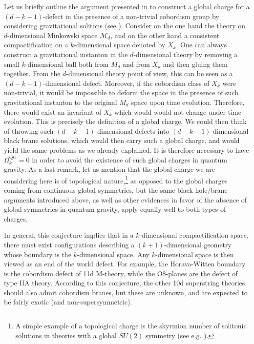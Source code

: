 \documentclass[11pt,a4paper]{article}
\begin{document}
Let us briefly outline the argument presented in \cite{McNamara:2019rup} to construct a global charge for a $(d-k-1)$-defect  in the presence of a non-trivial cobordism group by considering gravitational solitons (see \cite{Witten:1985xe}). Consider on the one hand the theory on $d$-dimensional Minkowski space $\mathcal{M}_d$, and on the other hand a consistent compactification on a $k$-dimensional space denoted by $X_k$. One can always construct a gravitational instanton in the $d$-dimensional theory by removing a small $k$-dimensional ball both from $M_d$ and from $X_k$ and then gluing them together. From the $d$-dimensional theory point of view, this can be seen as a $(d-k-1)$-dimensional defect. Moreover, if the cobordism class of $X_k$ were non-trivial, it would be impossible to deform the space in the presence of such gravitational instanton to the original $M_d$ space upon time evolution. Therefore, there would exist an invariant of $X_k$ which would would not change under time evolution. This is precisely the definition of  a global charge. We could then think of throwing such $(d-k-1)$-dimensional defects into $(d-k-1)$-dimensional black brane solutions, which would then carry such a global charge, and would yield the same problems as we already explained. It is therefore necessary to have $\Omega_k^{\mathrm{QG}}=0$ in order to avoid the existence of such global charges in quantum gravity. As a last remark, let us mention that the global charge we are considering here is of topological nature,\footnote{A simple example of a topological charge is the skyrmion number of solitonic solutions in theories with a global $SU(2)$ symmetry (see e.g. \cite{Tong:GaugeTheories}).} as opposed to the global charges coming from continuous global symmetries, but the same black hole/brane arguments introduced above, as well as other evidences in favor of the absence of global symmetries in quantum gravity, apply equally well to both types of charges.

In general, this conjecture implies that in a $k$-dimensional compactification space, there must exist configurations describing a $(k+1)$-dimensional geometry whose boundary is the $k$-dimensional space. Any $k$-dimensional space is then viewed as an end of the world defect. For example, the Horava-Witten boundary is the cobordism defect of 11d M-theory, while the O8-planes are the defect of type IIA theory. According to this conjecture, the other 10d superstring theories should also admit cobordism branes, but these are unknown, and are expected to be fairly exotic (and non-supersymmetric).
\end{document}
